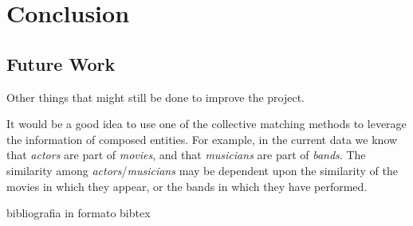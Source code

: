 \documentclass[epsfig,a4paper,11pt,titlepage,twoside,openany]{book}
\begin{document}





\chapter{Conclusion}
\label{chap:conclusion}

\section{Future Work}
\label{sec:future-work}

Other things that might still be done to improve the project.

It would be a good idea to use one of the collective matching methods
\cite{Dong2005_reference_reconciliation,bhattacharya07_collec_entit_resol_relat_data,Kalashnikov2006_collective_graph}
to leverage the information of composed entities. For example, in the current
data we know that \textit{actors} are part of \textit{movies}, and that
\textit{musicians} are part of \textit{bands}. The similarity among
\textit{actors}/\textit{musicians} may be dependent upon the similarity of the
movies in which they appear, or the bands in which they have performed.

\endgroup


bibliografia in formato bibtex
     
 
\end{document}
